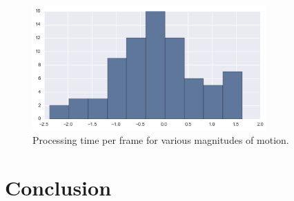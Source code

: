 \documentclass{article}
\begin{document}
\begin{figure}[H]
  \centering
    \includegraphics[width=0.8\textwidth]{test_flow.png}
  \caption{Processing time per frame for various magnitudes of motion.}
\end{figure}

\section{Conclusion}
\end{document}
